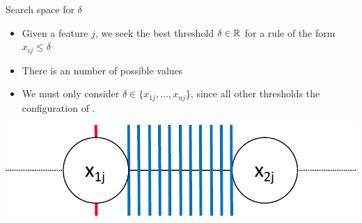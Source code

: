 \documentclass{beamer}
\begin{document}
\begin{frame}{Search space for $\delta$}
	\begin{itemize}
		\item Given a feature $j$, we seek the best threshold $\delta \in \mathbb{R}$ for a rule of the form $x_{ij} \leq \delta$
		\vspace{4mm}
		\item There is an  number of possible values
		\vspace{4mm}
		\item We must only consider $\delta \in \{ x_{1j}, \dots, x_{nj} \}$, since all other thresholds  the configuration of .
	\end{itemize}
	
	\vspace{3mm}
	\begin{center}
		\includegraphics[scale=0.5]{figures/equivalent_thresholds.pdf}
	\end{center}
\end{frame}
\end{document}
